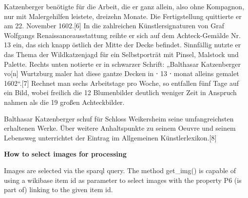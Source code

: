 \documentclass[
  letterpaper,
]{book}
\begin{document}
Katzenberger benötigte für die Arbeit, die er ganz allein, also ohne
Kompagnon, nur mit Malergehilfen leistete, dreizehn Monate. Die
Fertigstellung quittierte er am 22. November 1602.{[}6{]} In die
zahlreichen Künstlersignaturen von Graf Wolfgangs Renaissanceausstattung
reihte er sich auf dem Achteck-Gemälde Nr. 13 ein, das sich knapp
östlich der Mitte der Decke befindet. Sinnfällig nutzte er das Thema der
Wildkatzenjagd für ein Selbstporträt mit Pinsel, Malstock und Palette.
Rechts unten notierte er in schwarzer Schrift: „Balthasar Katzenberger
vo{[}n{]} Wurtzburg maler hat diese gantze Decken in ⋅ 13 ⋅ monat
alleins gemalet 1602``.{[}7{]} Rechnet man sechs Arbeitstage pro Woche,
so entfallen fünf Tage auf ein Bild, wobei freilich die 12 Blumenbilder
deutlich weniger Zeit in Anspruch nahmen als die 19 großen
Achteckbilder.

Balthasar Katzenberger schuf für Schloss Weikersheim seine
umfangreichsten erhaltenen Werke. Über weitere Anhaltspunkte zu seinem
Oeuvre und seinem Lebensweg unterrichtet der Eintrag im Allgemeinen
Künstlerlexikon.{[}8{]}

\textbf{How to select images for processing}

Images are selected via the sparql query. The method get\_img() is
capable of using a wikibase item id as parameter to select images with
the property P6 (is part of) linking to the given item id.
\end{document}
